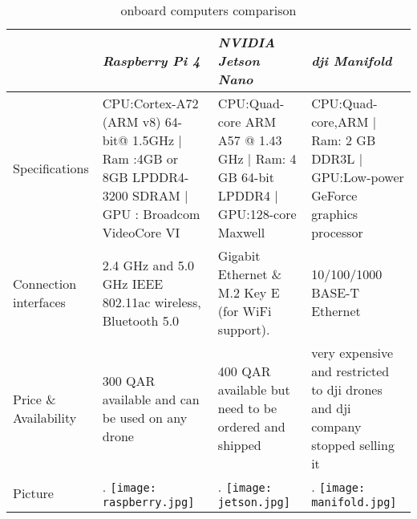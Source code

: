 \documentclass[../main.tex]{subfiles}
\begin{document}
\begin{table}[hbt!]
	\begin{tabular}{ | p{3cm} | p{4cm}| p{4cm} | p{4cm} |}
		\hline
		\textit{} & \textit{Raspberry Pi 4} & \textit{NVIDIA Jetson Nano} & \textit{dji Manifold}\\ \hline
		Specifications  & CPU:Cortex-A72 (ARM v8) 64-bit@ 1.5GHz | Ram :4GB or 8GB LPDDR4-3200 SDRAM | GPU : Broadcom VideoCore VI & CPU:Quad-core ARM A57 @ 1.43 GHz | Ram: 4 GB 64-bit LPDDR4   | GPU:128-core Maxwell & CPU:Quad-core,ARM | Ram: 2 GB DDR3L | GPU:Low-power GeForce graphics processor \\ \hline
		Connection interfaces & 2.4 GHz and 5.0 GHz IEEE 802.11ac wireless, Bluetooth 5.0 & Gigabit Ethernet \& M.2 Key E (for WiFi support). &10/100/1000 BASE-T Ethernet \\ \hline
		
		Price \& Availability & 300 QAR available and can be used on any drone & 400 QAR available but need to be ordered and shipped & very expensive and restricted to dji drones and dji company stopped selling it    \\ \hline
		Picture & \begin{minipage}{.2\textwidth}.
			\texttt{[image: raspberry.jpg]}
		\end{minipage}  & \begin{minipage}{.2\textwidth}.
		\texttt{[image: jetson.jpg]}
	\end{minipage} & \begin{minipage}{.2\textwidth}.
	\texttt{[image: manifold.jpg]}
\end{minipage} \\ \hline
		
		
		
	\end{tabular}
	\caption{onboard computers comparison}
\end{table} \label{tab: onboard computers }  
\newpage
\end{document}

